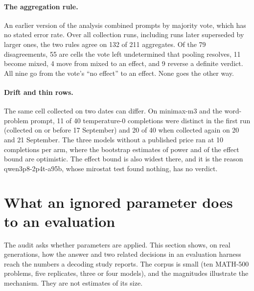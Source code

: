 \documentclass[10pt]{article}
\begin{document}
\paragraph{The aggregation rule.} An earlier version of the analysis combined prompts by majority vote, which has no stated error rate. Over all collection runs, including runs later superseded by larger ones, the two rules agree on 132 of 211 aggregates. Of the 79 disagreements, 55 are cells the vote left undetermined that pooling resolves, 11 become mixed, 4 move from mixed to an effect, and 9 reverse a definite verdict. All nine go from the vote's ``no effect'' to an effect. None goes the other way.

\paragraph{Drift and thin rows.} The same cell collected on two dates can differ. On minimax-m3 and the word-problem prompt, 11 of 40 temperature-0 completions were distinct in the first run (collected on or before 17 September) and 20 of 40 when collected again on 20 and 21 September. The three models without a published price ran at 10 completions per arm, where the bootstrap estimates of power and of the effect bound are optimistic. The effect bound is also widest there, and it is the reason qwen3p8-2p4t-a95b, whose mirostat test found nothing, has no verdict.

\section{What an ignored parameter does to an evaluation}
\label{sec:consequences}

The audit asks whether parameters are applied. This section shows, on real generations, how the answer and two related decisions in an evaluation harness reach the numbers a decoding study reports. The corpus is small (ten MATH-500 problems, five replicates, three or four models), and the magnitudes illustrate the mechanism. They are not estimates of its size.
\end{document}
